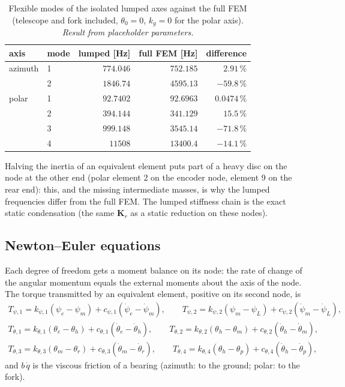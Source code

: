 \documentclass[10pt,a4paper]{article}
\numberwithin{equation}{section}
\begin{document}
\begin{table}[H]\centering\small
\caption{Flexible modes of the isolated lumped axes against the full FEM (telescope and fork included, $\theta_0 = 0$, $k_g = 0$ for the polar axis). \emph{Result from placeholder parameters.}}\label{tab:lump_freq}
\begin{tabular}{llrrr}\toprule
axis & mode & lumped [Hz] & full FEM [Hz] & difference \\ \midrule
azimuth & 1 & $774.046$ & $752.185$ & $2.91\,\%$ \\
 & 2 & $1846.74$ & $4595.13$ & $-59.8\,\%$ \\
polar & 1 & $92.7402$ & $92.6963$ & $0.0474\,\%$ \\
 & 2 & $394.144$ & $341.129$ & $15.5\,\%$ \\
 & 3 & $999.148$ & $3545.14$ & $-71.8\,\%$ \\
 & 4 & $11508$ & $13400.4$ & $-14.1\,\%$ \\
\bottomrule\end{tabular}\end{table}
Halving the inertia of an equivalent element puts part of a heavy disc on the node at the other end (polar element 2 on the encoder node, element 9 on the rear end): this, and the missing intermediate masses, is why the lumped frequencies differ from the full FEM. The lumped stiffness chain is the exact static condensation (the same $\mathbf K_r$ as a static reduction on these nodes).
\subsection{Newton--Euler equations}\label{subsec:lump_ne}
Each degree of freedom gets a moment balance on its node: the rate of change of the angular momentum equals the external moments about the axis of the node. The torque transmitted by an equivalent element, positive on its second node, is
\begin{gather}
T_{\psi,1} = k_{\psi,1}(\psi_e - \psi_m) + c_{\psi,1}(\dot\psi_e - \dot\psi_m),\qquad T_{\psi,2} = k_{\psi,2}(\psi_m - \psi_L) + c_{\psi,2}(\dot\psi_m - \dot\psi_L),\\
T_{\theta,1} = k_{\theta,1}(\theta_e - \theta_h) + c_{\theta,1}(\dot\theta_e - \dot\theta_h),\qquad T_{\theta,2} = k_{\theta,2}(\theta_h - \theta_m) + c_{\theta,2}(\dot\theta_h - \dot\theta_m),\\ T_{\theta,3} = k_{\theta,3}(\theta_m - \theta_r) + c_{\theta,3}(\dot\theta_m - \dot\theta_r),\qquad T_{\theta,4} = k_{\theta,4}(\theta_h - \theta_p) + c_{\theta,4}(\dot\theta_h - \dot\theta_p),
\end{gather}
and $b\,\dot q$ is the viscous friction of a bearing (azimuth: to the ground; polar: to the fork).
\end{document}
